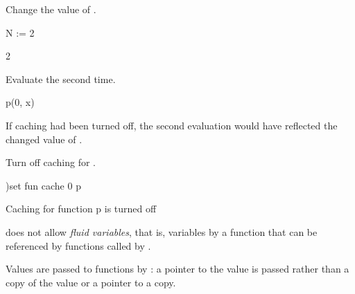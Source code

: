 \begin{xtc}
\begin{xtccomment}
Change the value of .
\end{xtccomment}
\begin{spadsrc}
N := 2 
\end{spadsrc}
\begin{TeXOutput}
\begin{fricasmath}{15}
2%
\end{fricasmath}
\end{TeXOutput}
\end{xtc}
\begin{xtc}
\begin{xtccomment}
Evaluate  the second time.
\end{xtccomment}
\begin{spadsrc}
p(0, x) 
\end{spadsrc}
\begin{TeXOutput}
\begin{fricasmath}{16}
%
\end{fricasmath}
\end{TeXOutput}
\end{xtc}
If caching had been turned off, the second evaluation would have
reflected the changed value of .
\begin{xtc}
\begin{xtccomment}
Turn off caching for .
\end{xtccomment}
\begin{spadsrc}
)set fun cache 0 p
\end{spadsrc}
\begin{SysCmdOutput}
   Caching for function p is turned off
\end{SysCmdOutput}
\end{xtc}

\Language{} does not allow {\it fluid variables}, that is, variables
 by a function  that can be referenced by
functions called by .

Values are passed to functions by : a pointer
to the value is passed rather than a copy of the value or a pointer to
a copy.

